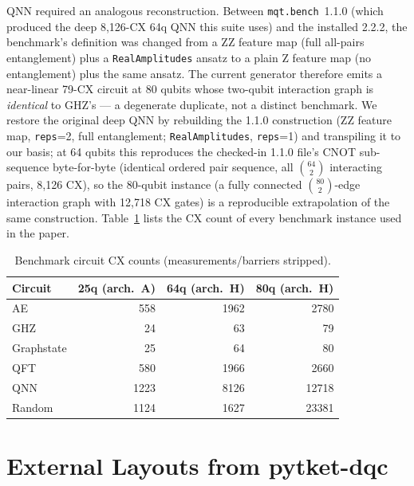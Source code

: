 \documentclass[journal]{IEEEtran}
\begin{document}
QNN required an analogous reconstruction. Between
\texttt{mqt.bench}~1.1.0 (which produced the deep 8{,}126-CX 64q QNN
this suite uses) and the installed 2.2.2, the benchmark's definition
was changed from a ZZ feature map (full all-pairs entanglement) plus a
\texttt{RealAmplitudes} ansatz to a plain Z feature map (no
entanglement) plus the same ansatz. The current generator therefore
emits a near-linear 79-CX circuit at 80 qubits whose two-qubit
interaction graph is \emph{identical} to GHZ's --- a degenerate
duplicate, not a distinct benchmark. We restore the original deep QNN
by rebuilding the 1.1.0 construction (ZZ feature map, \texttt{reps}=2,
full entanglement; \texttt{RealAmplitudes}, \texttt{reps}=1) and
transpiling it to our basis; at 64 qubits this reproduces the checked-in
1.1.0 file's CNOT sub-sequence byte-for-byte (identical ordered pair
sequence, all $\binom{64}{2}$ interacting pairs, 8{,}126 CX), so the
80-qubit instance (a fully connected $\binom{80}{2}$-edge interaction
graph with 12{,}718 CX gates) is a reproducible extrapolation of the
same construction. Table~\ref{tab:circuits} lists the CX count
of every benchmark instance used in the paper.

\begin{table}[h]
\centering
\caption{Benchmark circuit CX counts (measurements/barriers stripped).}
\label{tab:circuits}
\begin{tabular}{@{}lrrr@{}}
\toprule
Circuit & 25q (arch.\ A) & 64q (arch.\ H) & 80q (arch.\ H) \\
\midrule
AE          &  558 & 1962 &  2780 \\
GHZ         &   24 &   63 &    79 \\
Graphstate  &   25 &   64 &    80 \\
QFT         &  580 & 1966 &  2660 \\
QNN         & 1223 & 8126 & 12718 \\
Random      & 1124 & 1627 & 23381 \\
\bottomrule
\end{tabular}
\end{table}

\section{External Layouts from pytket-dqc}
\label{app:pytket}
\end{document}
